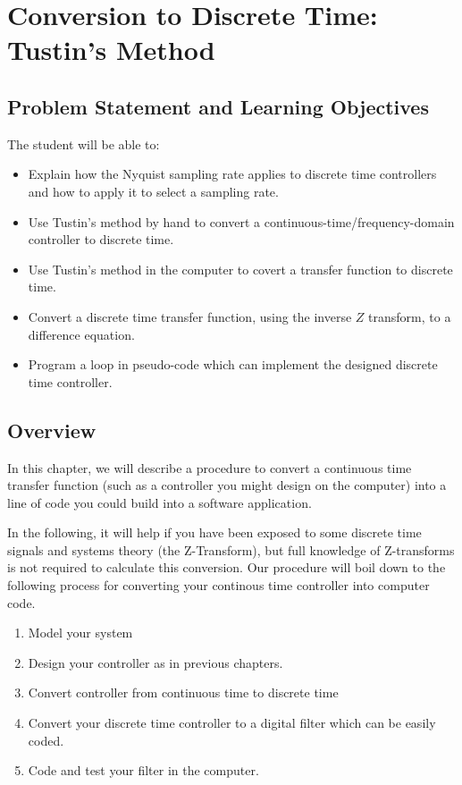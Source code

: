 %
%
%

\chapter{Conversion to Discrete Time: Tustin's Method}

\section{Problem Statement and Learning Objectives}

The student will be able to:
\begin{itemize}
    \item Explain how the Nyquist sampling rate applies to discrete  time controllers and
    how to apply it to select a sampling rate.
    \item Use Tustin's method by hand to convert a continuous-time/frequency-domain controller
    to discrete time.
    \item Use Tustin's method in the computer to covert a transfer function to discrete time.
    \item Convert a discrete time transfer function, using the inverse $Z$ transform, to
    a difference equation.
    \item  Program a loop in pseudo-code which can implement the designed discrete time controller.
\end{itemize}

\section{Overview}
  In this chapter, we will describe a procedure to convert a continuous time transfer function (such as a controller you might design on  the  computer) into a line of code you could build into a software application. 	%

In the following, it will help if you have been exposed to some discrete time signals and systems theory (the Z-Transform), but full knowledge of Z-transforms is not required to calculate this conversion.
Our procedure will boil down to the following process for converting your continous time controller
into computer code.

\begin{enumerate}
  \item Model your system
  \item Design your controller as in previous chapters.
  \item Convert controller from continuous time to discrete time
  \item Convert your discrete time controller to a digital filter which can be easily coded.
  \item Code and test your filter in the computer.
\end{enumerate}

